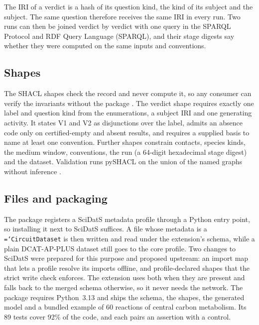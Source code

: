 \documentclass[5p]{elsarticle}
\theoremstyle{definition}
\theoremstyle{plain}
\newcommand{\st}[1]{\textsf{#1}}            %
\newcommand{\breakingtt}[1]{\texttt{\hyphenchar\font=`\-\relax #1}}  %
\newcommand{\term}[1]{\breakingtt{#1}}      %
\begin{document}
The IRI of a verdict is a hash of its question kind, the kind of its subject and the subject.
The same question therefore receives the same IRI in every run.
Two runs can then be joined verdict by verdict with one query in the SPARQL Protocol and RDF Query Language (SPARQL), and their stage digests say whether they were computed on the same inputs and conventions.

\subsection{Shapes}
\label{sec:shapes}

The SHACL shapes check the record and never compute it, so any consumer can verify the invariants without the package \citep{w3c2017shacl}.
The verdict shape requires exactly one label and question kind from the enumerations, a subject IRI and one generating activity.
It states V1 and V2 as disjunctions over the label, admits an absence code only on \st{certified-empty} and \st{absent} results, and requires a supplied basis to name at least one convention.
Further shapes constrain contacts, species kinds, the medium window, conventions, the run (a 64-digit hexadecimal stage digest) and the dataset.
Validation runs pySHACL on the union of the named graphs without inference \citep{sommer2025pyshacl}.

\subsection{Files and packaging}
\label{sec:scidats}

The package registers a SciDatS metadata profile through a Python entry point, so installing it next to SciDatS suffices.
A file whose metadata is a \term{CircuitDataset} is then written and read under the extension's schema, while a plain DCAT-AP-PLUS dataset still goes to the core profile.
Two changes to SciDatS were prepared for this purpose and proposed upstream: an import map that lets a profile resolve its imports offline, and profile-declared shapes that the strict write check enforces.
The extension uses both when they are present and falls back to the merged schema otherwise, so it never needs the network.
The package requires Python~3.13 and ships the schema, the shapes, the generated model and a bundled example of 60 reactions of central carbon metabolism.
Its 89 tests cover 92\% of the code, and each pairs an assertion with a control.

\end{document}
